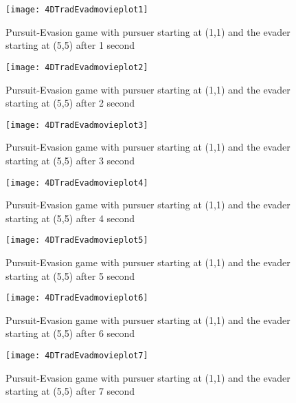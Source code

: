 \begin{figure}
\vspace{2.4in}
\centering
\texttt{[image: 4DTradEvadmovieplot1]}
\caption{Pursuit-Evasion game with pursuer starting at (1,1) and the evader starting at (5,5) after 1 second}
\label{4DTradEvadmovieplot1}
\end{figure}
\clearpage
\newpage

\begin{figure}
\vspace{2.4in}
\centering
\texttt{[image: 4DTradEvadmovieplot2]}
\caption{Pursuit-Evasion game with pursuer starting at (1,1) and the evader starting at (5,5) after 2 second}
\label{4DTradEvadmovieplot2}
\end{figure}
\clearpage
\newpage

\begin{figure}
\vspace{2.4in}
\centering
\texttt{[image: 4DTradEvadmovieplot3]}
\caption{Pursuit-Evasion game with pursuer starting at (1,1) and the evader starting at (5,5) after 3 second}
\label{4DTradEvadmovieplot3}
\end{figure}
\clearpage
\newpage

\begin{figure}
\vspace{2.4in}
\centering
\texttt{[image: 4DTradEvadmovieplot4]}
\caption{Pursuit-Evasion game with pursuer starting at (1,1) and the evader starting at (5,5) after 4 second}
\label{4DTradEvadmovieplot4}
\end{figure}
\clearpage
\newpage

\begin{figure}
\vspace{2.4in}
\centering
\texttt{[image: 4DTradEvadmovieplot5]}
\caption{Pursuit-Evasion game with pursuer starting at (1,1) and the evader starting at (5,5) after 5 second}
\label{4DTradEvadmovieplot5}
\end{figure}
\clearpage
\newpage

\begin{figure}
\vspace{2.4in}
\centering
\texttt{[image: 4DTradEvadmovieplot6]}
\caption{Pursuit-Evasion game with pursuer starting at (1,1) and the evader starting at (5,5) after 6 second}
\label{4DTradEvadmovieplot6}
\end{figure}
\clearpage
\newpage

\begin{figure}
\vspace{2.4in}
\centering
\texttt{[image: 4DTradEvadmovieplot7]}
\caption{Pursuit-Evasion game with pursuer starting at (1,1) and the evader starting at (5,5) after 7 second}
\label{4DTradEvadmovieplot7}
\end{figure}
\clearpage
\newpage

